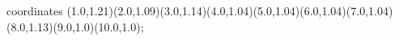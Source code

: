 					coordinates { (1.0,1.21)(2.0,1.09)(3.0,1.14)(4.0,1.04)(5.0,1.04)(6.0,1.04)(7.0,1.04)(8.0,1.13)(9.0,1.0)(10.0,1.0)};